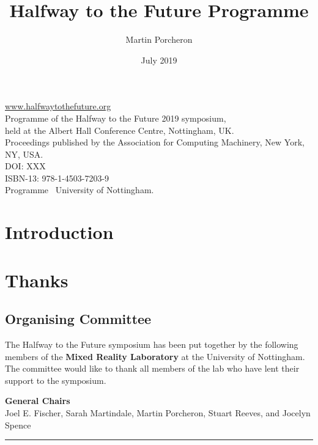 \documentclass[a4paper,oneside]{memoir}
\title{Halfway to the Future Programme}
\author{Martin Porcheron}
\date{July 2019}
\begin{document}
\frontmatter


\thispagestyle{empty}
\vspace*{\fill}
\begin{raggedright}
    \href{https://www.halfwaytothefuture.org/}{www.halfwaytothefuture.org}\\[.5cm]
    Programme of the Halfway to the Future 2019 symposium,\\held at the Albert Hall Conference Centre, Nottingham, UK.\\[.5cm]
    Proceedings published by the Association for Computing Machinery, New York, NY, USA.\\
    DOI: XXX\\
    ISBN-13: 978-1-4503-7203-9\\[.5cm]
    Programme \textcopyright~University of Nottingham.
\end{raggedright}
\clearpage

\mainmatter
\pagestyle{plain}


\chapter{Introduction}
\lipsum[1-4]







\chapter{Thanks}


\section{Organising Committee}

The Halfway to the Future symposium has been put together by the following members of the \textbf{Mixed Reality Laboratory} at the University of Nottingham. The committee would like to thank all members of the lab who have lent their support to the symposium.

\vspace{.5cm}

\noindent\textbf{General Chairs}\\
Joel E. Fischer, Sarah Martindale, Martin Porcheron, Stuart Reeves, and  Jocelyn Spence

\vspace*{.75cm}\hrule\vspace{.5cm}
\end{document}
